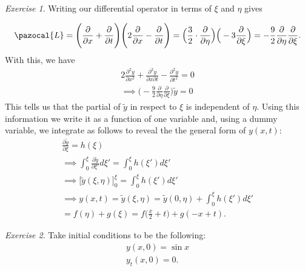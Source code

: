 \documentclass[12pt,oneside]{amsart}
\theoremstyle{definition}
\theoremstyle{remark}
\newtheorem{exer}{Exercise}
\numberwithin{equation}{exer}
\newcommand{\Lb}{\pazocal{L}}
\begin{document}
\newpage
\indent \newline
\begin{exer}
Writing our differential operator in terms of $\xi$ and $\eta$ gives
\end{exer}
\begin{align*}
    \Lb
    = \Bigg(\frac{\partial}{\partial x} + \frac{\partial}{\partial t}\Bigg)\Bigg(2\frac{\partial}{\partial x} - \frac{\partial}{\partial t}\Bigg) =  \Big(\frac{3}{2}\cdot \frac{\partial}{\partial \eta}\Big)\Big(-3\frac{\partial}{\partial \xi}\Big) = -\frac{9}{2}\frac{\partial}{\partial \eta}\frac{\partial}{\partial \xi}.
\end{align*}
With this, we have 
\begin{align*}
        2 \frac{\partial^2 y}{\partial x^2} + \frac{\partial^2 y}{\partial x \partial t} - \frac{\partial^2 y}{\partial t^2} =0\\
        \implies  \Big(-\frac{9}{2}\frac{\partial}{\partial \eta}\frac{\partial}{\partial \xi}\Big)\tilde{y} = 0
\end{align*}
This tells us that the partial of $\tilde{y}$ in respect to $\xi$ is independent of $\eta$. Using this information we write it as a function of one variable and, using a dummy variable, we integrate as follows to reveal the the general form of $y(x,t)$:
\begin{align*}
    \frac{\partial \tilde{y}}{\partial \xi} = h(\xi)\\
    \implies \int_0^\xi \frac{\partial \tilde{y}}{\partial \xi'} d\xi'= \int_0^\xi h(\xi')d\xi'\\
    \implies \Big[\tilde{y}(\xi,\eta)\Big]_0^\xi = \int_0^\xi h(\xi')d\xi'\\
    \implies y(x,t) = \tilde{y}(\xi,\eta) = \tilde{y}(0,\eta) + \int_0^\xi h(\xi')d\xi' \\
    =f(\eta) + g(\xi) = f\big(\frac{x}{2} + t \big) + g (-x+t).
\end{align*}
\newpage
\begin{exer}
Take initial conditions to be the following:
\begin{align*}
    y(x,0)= \sin{x}\\
    y_t(x,0) = 0.
\end{align*}
\end{exer}
\end{document}

